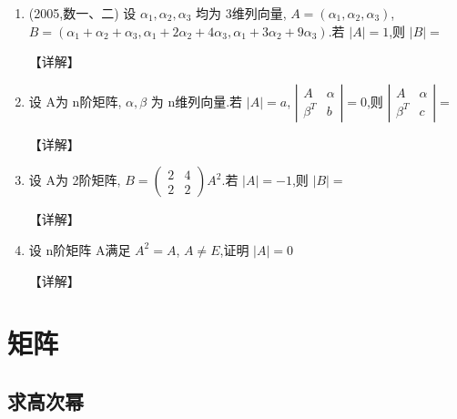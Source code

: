 \documentclass[12pt, a4paper, oneside, UTF8]{ctexbook}
\begin{document}
\begin{enumerate}[label=\arabic*.,start=6]
    \item (2005,数一、二) 设 $\alpha_1,\alpha_2,\alpha_3$ 均为 3维列向量, $A=(\alpha_1,\alpha_2,\alpha_3)$,
    $B=(\alpha_1+\alpha_2+\alpha_3,\alpha_1+2\alpha_2+4\alpha_3,\alpha_1+3\alpha_2+9\alpha_3)$.若 $|A|=1$,则 $|B|=$ \underline{\hspace{3cm}}
    
    \begin{solution}
    【详解】
    \end{solution}
    
    \item 设 A为 n阶矩阵, $\alpha,\beta$ 为 n维列向量.若 $|A|=a$,
    $\left|\begin{array}{ll}A & \alpha \\ \beta^{T} & b\end{array}\right|=0$,则
    $\left|\begin{array}{ll}A & \alpha \\ \beta^{T} & c\end{array}\right|=$ \underline{\hspace{3cm}}
    
    \begin{solution}
    【详解】
    \end{solution}
    
    \item 设 A为 2阶矩阵, $B=\begin{pmatrix}2 & 4 \\ 2 & 2\end{pmatrix}A^2$.若 $|A|=-1$,则 $|B|=$ \underline{\hspace{3cm}}
    
    \begin{solution}
    【详解】
    \end{solution}
    
    \item  设 n阶矩阵 A满足 $A^2=A$, $A\neq E$,证明 $|A|=0$
    
    \begin{solution}
    【详解】
    \end{solution}
\end{enumerate}

\section{矩阵}
\subsection{求高次幂}
\end{document}
